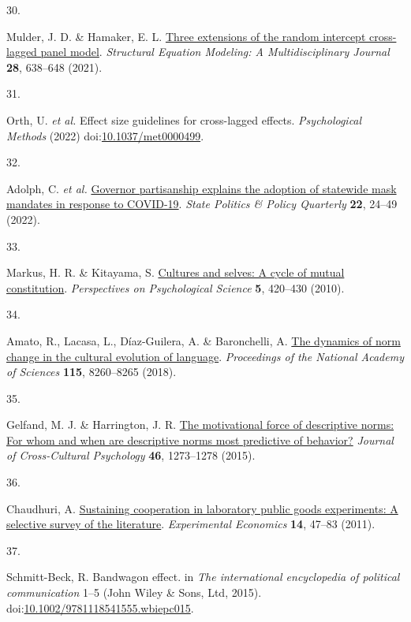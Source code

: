 \documentclass[
  man, donotrepeattitle,floatsintext]{apa6}
\newlength{\cslhangindent}
\newlength{\csllabelwidth}
\newlength{\cslentryspacingunit} %
\newenvironment{CSLReferences}[2] %
 {%
  \setlength{\parindent}{0pt}
  \ifodd #1
  \let\oldpar\par
  \def\par{\hangindent=\cslhangindent\oldpar}
  \fi
  \setlength{\parskip}{#2\cslentryspacingunit}
 }%
 {}
\newcommand{\CSLLeftMargin}[1]{\parbox[t]{\csllabelwidth}{#1}}
\newcommand{\CSLRightInline}[1]{\parbox[t]{\linewidth - \csllabelwidth}{#1}\break}
\begin{document}
\begin{CSLReferences}{0}{0}
\leavevmode{}%
\CSLLeftMargin{30. }%
\CSLRightInline{Mulder, J. D. \& Hamaker, E. L. \href{https://doi.org/10.1080/10705511.2020.1784738}{Three extensions of the random intercept cross-lagged panel model}. \emph{Structural Equation Modeling: A Multidisciplinary Journal} \textbf{28}, 638--648 (2021).}

\leavevmode{}%
\CSLLeftMargin{31. }%
\CSLRightInline{Orth, U. \emph{et al.} Effect size guidelines for cross-lagged effects. \emph{Psychological Methods} (2022) doi:\href{https://doi.org/10.1037/met0000499}{10.1037/met0000499}.}

\leavevmode{}%
\CSLLeftMargin{32. }%
\CSLRightInline{Adolph, C. \emph{et al.} \href{https://doi.org/10.1017/spq.2021.22}{Governor partisanship explains the adoption of statewide mask mandates in response to COVID-19}. \emph{State Politics \& Policy Quarterly} \textbf{22}, 24--49 (2022).}

\leavevmode{}%
\CSLLeftMargin{33. }%
\CSLRightInline{Markus, H. R. \& Kitayama, S. \href{https://doi.org/10.1177/1745691610375557}{Cultures and selves: A cycle of mutual constitution}. \emph{Perspectives on Psychological Science} \textbf{5}, 420--430 (2010).}

\leavevmode{}%
\CSLLeftMargin{34. }%
\CSLRightInline{Amato, R., Lacasa, L., Díaz-Guilera, A. \& Baronchelli, A. \href{https://doi.org/10.1073/pnas.1721059115}{The dynamics of norm change in the cultural evolution of language}. \emph{Proceedings of the National Academy of Sciences} \textbf{115}, 8260--8265 (2018).}

\leavevmode{}%
\CSLLeftMargin{35. }%
\CSLRightInline{Gelfand, M. J. \& Harrington, J. R. \href{https://doi.org/10.1177/0022022115600796}{The motivational force of descriptive norms: For whom and when are descriptive norms most predictive of behavior?} \emph{Journal of Cross-Cultural Psychology} \textbf{46}, 1273--1278 (2015).}

\leavevmode{}%
\CSLLeftMargin{36. }%
\CSLRightInline{Chaudhuri, A. \href{https://doi.org/10.1007/s10683-010-9257-1}{Sustaining cooperation in laboratory public goods experiments: A selective survey of the literature}. \emph{Experimental Economics} \textbf{14}, 47--83 (2011).}

\leavevmode{}%
\CSLLeftMargin{37. }%
\CSLRightInline{Schmitt-Beck, R. Bandwagon effect. in \emph{The international encyclopedia of political communication} 1--5 (John Wiley \& Sons, Ltd, 2015). doi:\href{https://doi.org/10.1002/9781118541555.wbiepc015}{10.1002/9781118541555.wbiepc015}.}


\end{CSLReferences}
\end{document}
